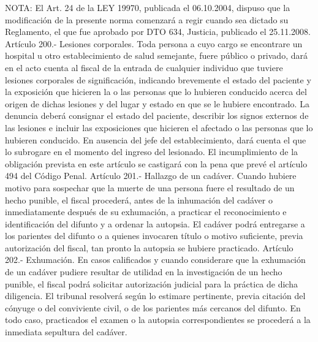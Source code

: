 NOTA:
      El Art. 24 de la LEY 19970, publicada el 06.10.2004, dispuso que la modificación de la presente norma comenzará a regir cuando sea dictado su Reglamento, el que fue aprobado por DTO 634, Justicia, publicado el 25.11.2008.
    Artículo 200.- Lesiones corporales. Toda persona a cuyo cargo se encontrare un hospital u otro establecimiento de salud semejante, fuere público o privado, dará en el acto cuenta al fiscal de la entrada de cualquier individuo que tuviere lesiones corporales de significación, indicando brevemente el estado del paciente y la exposición que hicieren la o las personas que lo hubieren conducido acerca del origen de dichas lesiones y del lugar y estado en que se le hubiere encontrado. La denuncia deberá consignar el estado del paciente, describir los signos externos de las lesiones e incluir las exposiciones que hicieren el afectado o las personas que lo hubieren conducido.
    En ausencia del jefe del establecimiento, dará cuenta el que lo subrogare en el momento del ingreso del lesionado.
    El incumplimiento de la obligación prevista en este artículo se castigará con la pena que prevé el artículo 494 del Código Penal.
    Artículo 201.- Hallazgo de un cadáver. Cuando hubiere motivo para sospechar que la muerte de una persona fuere el resultado de un hecho punible, el fiscal procederá, antes de la inhumación del cadáver o inmediatamente después de su exhumación, a practicar el reconocimiento e identificación del difunto y a ordenar la autopsia.
    El cadáver podrá entregarse a los parientes del difunto o a quienes invocaren título o motivo suficiente, previa autorización del fiscal, tan pronto la autopsia se hubiere practicado.
    Artículo 202.- Exhumación. En casos calificados y cuando considerare que la exhumación de un cadáver pudiere resultar de utilidad en la investigación de un hecho punible, el fiscal podrá solicitar autorización judicial para la práctica de dicha diligencia.
    El tribunal resolverá según lo estimare pertinente, previa citación del cónyuge o del conviviente civil, o de los parientes más cercanos del difunto.
    En todo caso, practicados el examen o la autopsia correspondientes se procederá a la inmediata sepultura del cadáver.

